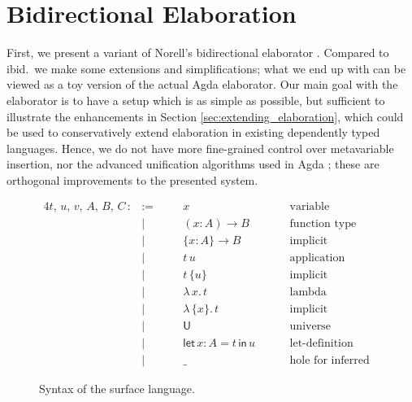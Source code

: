 \documentclass[acmsmall,review,anonymous,prologue,dvipsnames]{acmart}\settopmatter{printfolios=true,printccs=false,printacmref=false}
\newcommand{\slet}{\boldsymbol{\mathsf{let}}}
\renewcommand{\sin}{\boldsymbol{\mathsf{in}}}
\renewcommand{\U}{\mathsf{U}}
\theoremstyle{remark}
\begin{document}
\section{Bidirectional Elaboration}
\label{sec:bidirectional_elaboration}

First, we present a variant of Norell's bidirectional elaborator
\cite[Chapter~3]{norell07thesis}. Compared to ibid.\ we make some extensions and
simplifications; what we end up with can be viewed as a toy version of the
actual Agda elaborator. Our main goal with the elaborator is to have a setup
which is as simple as possible, but sufficient to illustrate the enhancements in
Section \ref{sec:extending_elaboration}, which could be used to conservatively
extend elaboration in existing dependently typed languages. Hence, we do not
have more fine-grained control over metavariable insertion, nor the advanced
unification algorithms used in Agda \cite{abel2011higher}; these are orthogonal
improvements to the presented system.

\begin{figure}[h]
\begin{alignat*}{4}
  t,\,u,\,v,\,A,\,B,\,C\, :&:=\quad  && x\hspace{8em}              & \text{variable}                 &  \\
                           & |       && (x : A)\to B               & \text{function type}            &  \\
                           & |       && \{x : A\}\to B             & \text{implicit function type}   &  \\
                           & |       && t\,u                       & \text{application}              &  \\
                           & |       && t\,\{u\}                   & \text{implicit application}     &  \\
                           & |       && \lambda\,x.\, t            & \text{lambda abstraction}       &  \\
                           & |       && \lambda\,\{x\}.\,t         & \text{implicit abstraction}     &  \\
                           & |       && \U                         & \text{universe}                 &  \\
                           & |       && \slet\,x : A = t\,\sin\, u & \text{let-definition}           &  \\
                           & |       && \_                         & \text{hole for inferred term}   &
\end{alignat*}
\caption{Syntax of the surface language.}
\label{fig:surface}
\end{figure}
\end{document}

